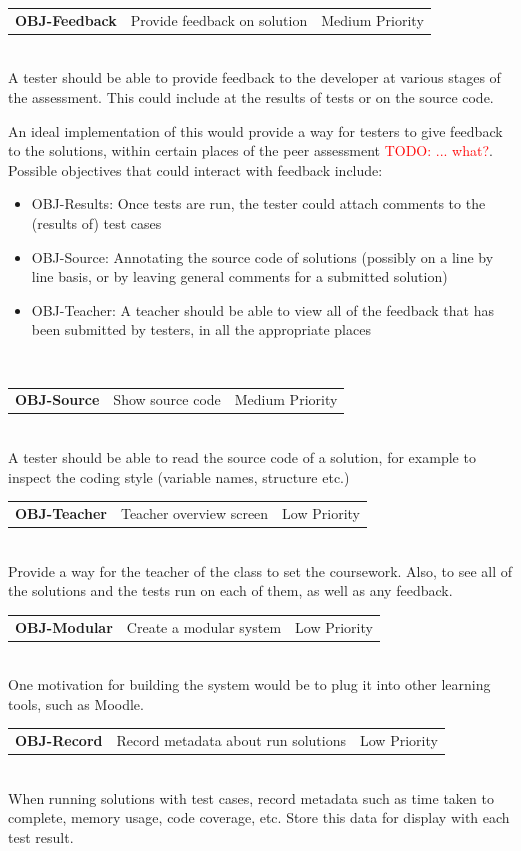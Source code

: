 \documentclass[a4paper,11pt]{report}
\newcommand{\objitem}[4]{\begin{tabularx}{\textwidth}{lXr} \textbf{OBJ-#1} & #2 & #3\end{tabularx}\\#4\\}
\newcommand{\todo}[1]{\textcolor{red}{TODO: #1}}
\begin{document}
\objitem{Feedback}{Provide feedback on solution}{Medium Priority}{A tester should be able to provide feedback to the developer at various stages of the assessment. This could include at the results of tests or on the source code.\par
An ideal implementation of this would provide a way for testers to give feedback to the solutions, within certain places of the peer assessment \todo{... what?}. Possible objectives that could interact with feedback include:
\begin{itemize}
 \item OBJ-Results: Once tests are run, the tester could attach comments to the (results of) test cases
 \item OBJ-Source: Annotating the source code of solutions (possibly on a line by line basis, or by leaving general comments for a submitted solution)
 \item OBJ-Teacher: A teacher should be able to view all of the feedback that has been submitted by testers, in all the appropriate places
\end{itemize}~}
\objitem{Source}{Show source code}{Medium Priority}{A tester should be able to read the source code of a solution, for example to inspect the coding style (variable names, structure etc.)}
\objitem{Teacher}{Teacher overview screen}{Low Priority}{Provide a way for the teacher of the class to set the coursework. Also, to see all of the solutions and the tests run on each of them, as well as any feedback.}
\objitem{Modular}{Create a modular system}{Low Priority}{One motivation for building the system would be to plug it into other learning tools, such as Moodle.}
\objitem{Record}{Record metadata about run solutions}{Low Priority}{When running solutions with test cases, record metadata such as time taken to complete, memory usage, code coverage, etc. Store this data for display with each test result.}
\end{document}
